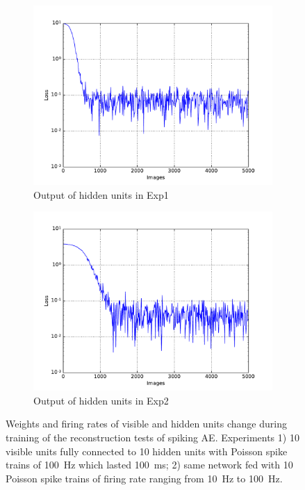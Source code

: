 \begin{figure}
\begin{subfigure}[t]{0.4\textwidth}
		\includegraphics[width=\textwidth]{pics_sdlm/03_exp_SAE_noise_long/exp1_mse_nons.pdf}
		\caption{Output of hidden units in Exp1}
	\end{subfigure}
	\begin{subfigure}[t]{0.4\textwidth}
		\includegraphics[width=\textwidth]{pics_sdlm/03_exp_SAE_noise_long/exp2_mse_nons.pdf}
		\caption{Output of hidden units in Exp2}
	\end{subfigure}
	\caption{Weights and firing rates of visible and hidden units change during training of the reconstruction tests of spiking AE. 
		Experiments 1) 10 visible units fully connected to 10 hidden units with Poisson spike trains of 100~Hz which lasted 100~ms; 2) same network fed with 10 Poisson spike trains of firing rate ranging from 10~Hz to 100~Hz.}
\end{figure}

